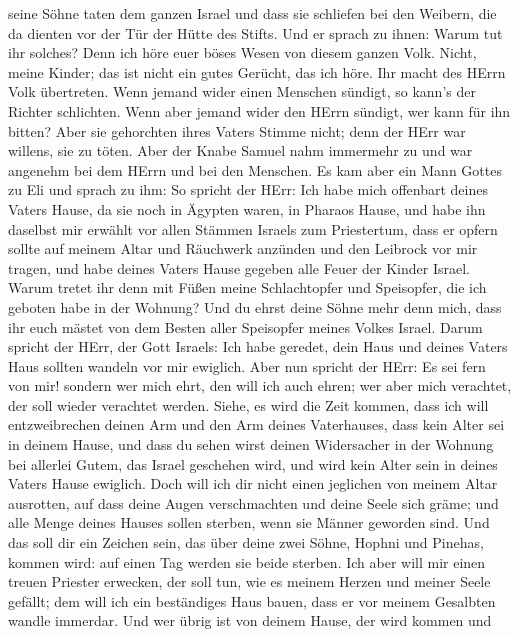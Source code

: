 seine Söhne taten dem ganzen Israel und dass sie schliefen bei den
Weibern, die da dienten vor der Tür der Hütte des Stifts. 
Und er sprach zu ihnen: Warum tut ihr solches? Denn ich höre euer böses
Wesen von diesem ganzen Volk.  Nicht, meine Kinder; das ist
nicht ein gutes Gerücht, das ich höre. Ihr macht des HErrn Volk
übertreten.  Wenn jemand wider einen Menschen sündigt, so
kann's der Richter schlichten. Wenn aber jemand wider den HErrn sündigt,
wer kann für ihn bitten? Aber sie gehorchten ihres Vaters Stimme nicht;
denn der HErr war willens, sie zu töten.  Aber der Knabe
Samuel nahm immermehr zu und war angenehm bei dem HErrn und bei den
Menschen.  Es kam aber ein Mann Gottes zu Eli und sprach zu
ihm: So spricht der HErr: Ich habe mich offenbart deines Vaters Hause,
da sie noch in Ägypten waren, in Pharaos Hause,  und habe
ihn daselbst mir erwählt vor allen Stämmen Israels zum Priestertum, dass
er opfern sollte auf meinem Altar und Räuchwerk anzünden und den
Leibrock vor mir tragen, und habe deines Vaters Hause gegeben alle Feuer
der Kinder Israel.  Warum tretet ihr denn mit Füßen meine
Schlachtopfer und Speisopfer, die ich geboten habe in der Wohnung? Und
du ehrst deine Söhne mehr denn mich, dass ihr euch mästet von dem Besten
aller Speisopfer meines Volkes Israel.  Darum spricht der
HErr, der Gott Israels: Ich habe geredet, dein Haus und deines Vaters
Haus sollten wandeln vor mir ewiglich. Aber nun spricht der HErr: Es sei
fern von mir! sondern wer mich ehrt, den will ich auch ehren; wer aber
mich verachtet, der soll wieder verachtet werden.  Siehe,
es wird die Zeit kommen, dass ich will entzweibrechen deinen Arm und den
Arm deines Vaterhauses, dass kein Alter sei in deinem Hause,
 und dass du sehen wirst deinen Widersacher in der Wohnung
bei allerlei Gutem, das Israel geschehen wird, und wird kein Alter sein
in deines Vaters Hause ewiglich.  Doch will ich dir nicht
einen jeglichen von meinem Altar ausrotten, auf dass deine Augen
verschmachten und deine Seele sich gräme; und alle Menge deines Hauses
sollen sterben, wenn sie Männer geworden sind.  Und das
soll dir ein Zeichen sein, das über deine zwei Söhne, Hophni und
Pinehas, kommen wird: auf einen Tag werden sie beide sterben.
 Ich aber will mir einen treuen Priester erwecken, der soll
tun, wie es meinem Herzen und meiner Seele gefällt; dem will ich ein
beständiges Haus bauen, dass er vor meinem Gesalbten wandle immerdar.
 Und wer übrig ist von deinem Hause, der wird kommen und
